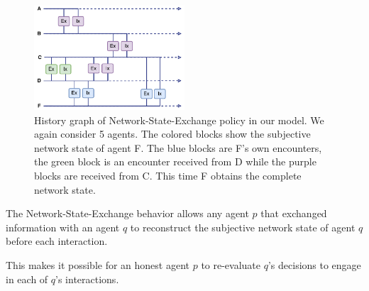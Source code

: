 \begin{figure}
    \centering
    \includegraphics[width=0.5\textwidth]{images/network_state_exchange.pdf}
    \caption{History graph of Network-State-Exchange policy in our model. We again consider 5 agents. The 
    colored blocks show the subjective network state of agent F. The blue blocks are F's own encounters,
    the green block is an encounter received from D while the purple blocks are received from C. This
    time F obtains the complete network state.}
    \label{fig:network_state_exchange}
\end{figure}

The Network-State-Exchange behavior allows any agent $p$ that exchanged information with an agent $q$
to reconstruct the subjective network state of agent $q$ before each interaction. 



This makes it possible for an honest agent $p$ to re-evaluate $q$'s decisions to engage in each of $q$'s 
interactions.

